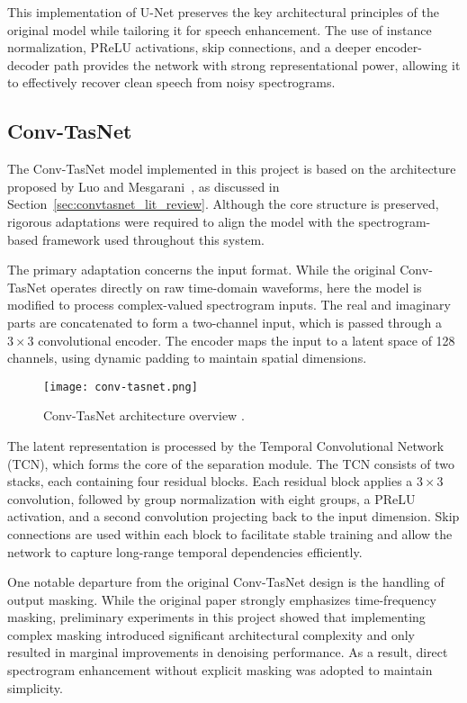 This implementation of U-Net preserves the key architectural principles of the original model while tailoring it for speech enhancement. The use of instance normalization, PReLU activations, skip connections, and a deeper encoder-decoder path provides the network with strong representational power, allowing it to effectively recover clean speech from noisy spectrograms.


\subsection{Conv-TasNet}
\label{sec:convtasnet}

The Conv-TasNet model implemented in this project is based on the architecture proposed by Luo and Mesgarani~\cite{luo2019conv}, as discussed in Section~\ref{sec:convtasnet_lit_review}. Although the core structure is preserved, rigorous adaptations were required to align the model with the spectrogram-based framework used throughout this system.

The primary adaptation concerns the input format. While the original Conv-TasNet operates directly on raw time-domain waveforms, here the model is modified to process complex-valued spectrogram inputs. The real and imaginary parts are concatenated to form a two-channel input, which is passed through a \(3 \times 3\) convolutional encoder. The encoder maps the input to a latent space of 128 channels, using dynamic padding to maintain spatial dimensions.

\begin{figure}[h]
    \centering
    \texttt{[image: conv-tasnet.png]}
    \caption{\label{fig:convtasnet}Conv-TasNet architecture overview \cite{luo2019conv}.}
\end{figure}

The latent representation is processed by the Temporal Convolutional Network (TCN), which forms the core of the separation module. The TCN consists of two stacks, each containing four residual blocks. Each residual block applies a \(3 \times 3\) convolution, followed by group normalization with eight groups, a PReLU activation, and a second convolution projecting back to the input dimension. Skip connections are used within each block to facilitate stable training and allow the network to capture long-range temporal dependencies efficiently.

One notable departure from the original Conv-TasNet design is the handling of output masking. While the original paper strongly emphasizes time-frequency masking, preliminary experiments in this project showed that implementing complex masking introduced significant architectural complexity and only resulted in marginal improvements in denoising performance. As a result, direct spectrogram enhancement without explicit masking was adopted to maintain simplicity.


